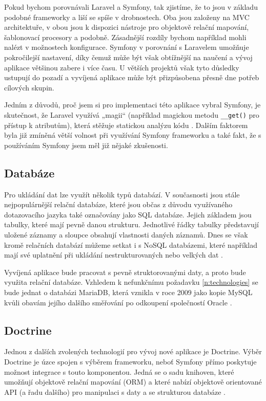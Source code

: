 Pokud bychom porovnávali Laravel a Symfony, tak zjistíme, že to jsou v základu podobné frameworky a liší se spíše v drobnostech. Oba jsou založeny na MVC architektuře, v obou jsou k dispozici nástroje pro objektově relační mapování, šablonovací procesory a podobně. Zásadnější rozdíly bychom například mohli nalézt v možnostech konfigurace. Symfony v porovnání s Laravelem umožňuje pokročilejší nastavení, díky čemuž může být však obtížnější na naučení a vývoj aplikace většinou zabere i více času. U větších projektů však tyto důsledky ustupují do pozadí a vyvíjená aplikace může být přizpůsobena přesně dne potřeb cílových skupin. \cite{symfony_laravel_comparison}

Jedním z důvodů, proč jsem si pro implementaci této aplikace vybral Symfony, je skutečnost, že Laravel využívá „magii“ (například magickou metodu \verb|__get()| pro přístup k atributům), která stěžuje statickou analýzu kódu \cite{larastan}. Dalším faktorem byla již zmíněná větší volnost při využívání Symfony frameworku a také fakt, že s používáním Symfony jsem měl již nějaké zkušenosti.

\subsection{Databáze}
Pro ukládání dat lze využít několik typů databází. V současnosti jsou stále nejpopulárnější relační databáze, které jsou občas z důvodu využívaného dotazovacího jazyka také označovány jako SQL databáze. Jejich základem jsou tabulky, které mají pevně danou strukturu. Jednotlivé řádky tabulky  představují uložené záznamy a sloupce obsahují vlastnosti daných záznamů. \cite{databases} Dnes se však kromě relačních databází můžeme setkat i s NoSQL databázemi, které například mají své uplatnění při ukládání nestrukturovaných nebo velkých dat \cite{nosql}.

Vyvíjená aplikace bude pracovat s pevně struktorovanými daty, a proto bude využita relační databáze. Vzhledem k nefunkčnímu požadavku \ref{n:technologies} se bude jednat o databázi MariaDB, která vznikla v roce 2009 jako kopie MySQL kvůli obavám jejího dalšího směřování po odkoupení společností Oracle \cite{mariadb}.

\subsection{Doctrine}
Jednou z dalších zvolených technologií pro vývoj nové aplikace je Doctrine. Výběr Doctrine je úzce spojen s výběrem frameworku, neboť Symfony přímo poskytuje možnost integrace s touto komponentou. Jedná se o sadu knihoven, které umožňují objektově relační mapování (ORM) a které nabízí objektově orientované API (a řadu dalšího) pro manipulaci s daty a se strukturou databáze \cite{doctrine_orm, doctrine_dbal}.

